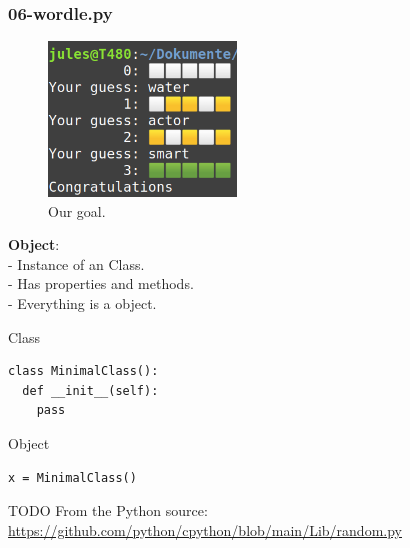\documentclass{beamer}
\begin{document}
\begin{frame}[fragile]
	\frametitle{06-wordle.py}
	\begin{figure}
		\includegraphics[width=5cm]{figures/wordle_terminal.png}
		\caption{Our goal.}
	\end{figure}
\end{frame}

\begin{frame}[fragile]
	\textbf{Object}:\\
	- Instance of an Class.\\
	- Has properties and methods. \\
	- Everything is a object.\\
\begin{exampleblock}{Class}
	
	\begin{verbatim}
class MinimalClass():
  def __init__(self):
    pass
	\end{verbatim}
\end{exampleblock}	
\begin{block}{Object}
\begin{verbatim}
x = MinimalClass()
\end{verbatim}	
\end{block}	
\end{frame}



\begin{frame}[fragile]
	TODO
	From the Python source: \url{https://github.com/python/cpython/blob/main/Lib/random.py}	
\end{frame}
\end{document}
